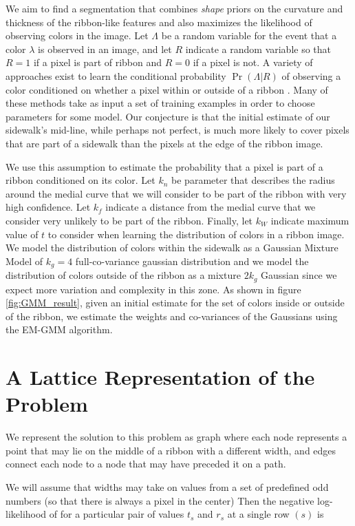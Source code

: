 We aim to find a segmentation that combines \textit{shape} priors on the curvature and thickness of the ribbon-like features and also maximizes the likelihood of observing colors in the image. 
Let $\Lambda$ be a random variable for the event that a color $\lambda$ is observed in an image, and let $R$ indicate a random variable so that $R=1$ if a pixel is part of ribbon and $R=0$ if a pixel is not. A variety of approaches exist to learn the conditional probability $\Pr(\Lambda|R)$ of observing a color conditioned on whether a pixel within or outside of a ribbon \cite{hartigan1979algorithm, jordan1999introduction}. Many of these methods take as input a set of training examples in order to choose parameters for some model.  Our conjecture is that the initial estimate of our sidewalk's mid-line, while perhaps not perfect, is much more likely to cover pixels that are part of a sidewalk than the pixels at the edge of the ribbon image. 

We use this assumption to estimate the probability that a pixel is part of a ribbon conditioned on its color. Let $k_n$ be parameter that describes the radius around the medial curve that we will consider to be part of the ribbon with very high confidence. Let $k_f$ indicate a distance from the medial curve that we consider very unlikely to be part of the ribbon. Finally, let $k_W$ indicate maximum value of $t$ to consider when learning the distribution of colors in a ribbon image.  We model the distribution of colors within the sidewalk as a Gaussian Mixture Model of $k_g=4$ full-co-variance gaussian distribution and we model the distribution of colors outside of the ribbon as a mixture $2k_g$ Gaussian since we expect more variation and complexity in this zone. As shown in figure \ref{fig:GMM_result}, given an initial estimate for the set of colors inside or outside of the ribbon, we estimate the weights and co-variances of the Gaussians using the \ac{EM-GMM} \cite{sridharan2014gaussian} algorithm. 


\section{A Lattice Representation of the Problem} 
We represent the solution to this problem as graph where each node represents a point that may lie on the middle of a ribbon with a different width, and edges connect each node to a node that may have preceded it on a path. 

We will assume that widths may take on values from a set of predefined odd numbers (so that there is always a pixel in the center) 
Then the negative log-likelihood of for a particular pair of values $t_s$ and $r_s$ at a single row $(s)$ is 


